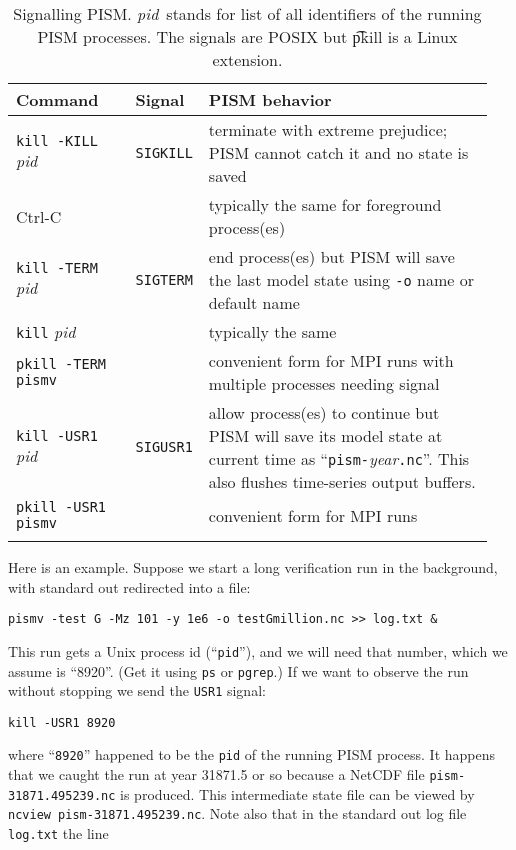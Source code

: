 \newcommand\pid{\textsl{pid}}
\newcommand\same{(\textsl{same})}
\begin{table}[ht]
\caption{Signalling PISM.  \pid~stands for list of all identifiers of the running PISM processes.  The signals are POSIX but \t{pkill} is a Linux extension.}\label{tab:signals}
\begin{tabular}{p{0.25\linewidth}p{0.1\linewidth}p{0.6\linewidth}}\hline
\textbf{Command} & \textbf{Signal} & \textbf{PISM behavior} \\
\hline
\texttt{kill -KILL} \pid & \texttt{SIGKILL} & terminate with extreme prejudice; PISM cannot catch it and no state is saved \\
Ctrl-C &  & typically the same for foreground process(es)  \\
\hline
\texttt{kill -TERM} \pid & \texttt{SIGTERM} & end process(es) but PISM will save the last model state using \verb|-o| name or default name \\
\texttt{kill} \pid &  & typically the same \\
\texttt{pkill -TERM pismv} &  & convenient form for MPI runs with multiple processes needing signal \\
\hline
\texttt{kill -USR1} \pid & \texttt{SIGUSR1} & allow process(es) to continue but PISM will save its model state at current time as ``\texttt{pism-}\textsl{year}\texttt{.nc}''. This also flushes time-series output buffers. \\
\texttt{pkill -USR1 pismv} &  & convenient form for MPI runs \\
\hline\normalsize
\end{tabular}
\end{table}

Here is an example.  Suppose we start a long verification run in the background, with standard out redirected into a file:

\verb|pismv -test G -Mz 101 -y 1e6 -o testGmillion.nc >> log.txt &|

\noindent This run gets a Unix process id (``\verb|pid|''), and we will need that number, which we assume is ``8920''.  (Get it using \verb|ps| or \verb|pgrep|.)  If we want to observe the run without stopping we send the \verb|USR1| signal:

\verb|kill -USR1 8920|

\noindent where ``\verb|8920|'' happened to be the \verb|pid| of the running PISM process.  It happens that we caught the run at year 31871.5 or so because a NetCDF file \verb|pism-31871.495239.nc| is produced.  This intermediate state file can be viewed by \verb|ncview pism-31871.495239.nc|.  Note also that in the standard out log file \verb|log.txt| the line

